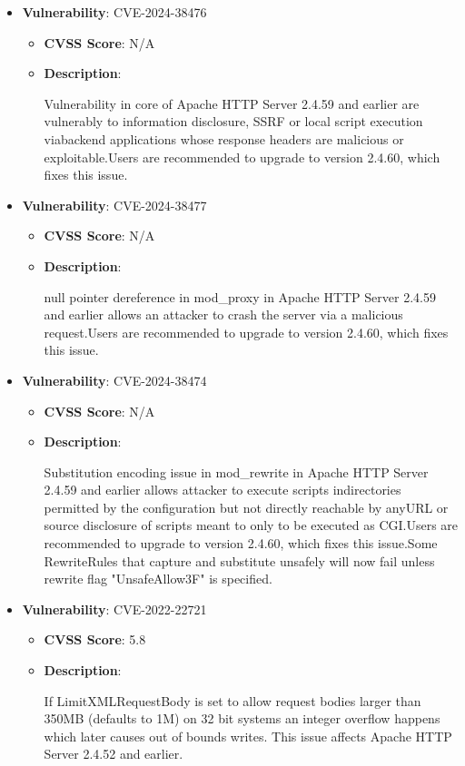 \documentclass{article}
\begin{document}
\begin{itemize}
        \item \textbf{Vulnerability}: CVE-2024-38476
        \begin{itemize}
            \item \textbf{CVSS Score}:  N/A 
            \item \textbf{Description}:
            \parbox[t]{0.9\linewidth}{
                \ttfamily Vulnerability in core of Apache HTTP Server 2.4.59 and earlier are vulnerably to information disclosure, SSRF or local script execution viabackend applications whose response headers are malicious or exploitable.Users are recommended to upgrade to version 2.4.60, which fixes this issue.
            }
        \end{itemize}
    
        \item \textbf{Vulnerability}: CVE-2024-38477
        \begin{itemize}
            \item \textbf{CVSS Score}:  N/A 
            \item \textbf{Description}:
            \parbox[t]{0.9\linewidth}{
                \ttfamily null pointer dereference in mod\_proxy in Apache HTTP Server 2.4.59 and earlier allows an attacker to crash the server via a malicious request.Users are recommended to upgrade to version 2.4.60, which fixes this issue.
            }
        \end{itemize}
    
        \item \textbf{Vulnerability}: CVE-2024-38474
        \begin{itemize}
            \item \textbf{CVSS Score}:  N/A 
            \item \textbf{Description}:
            \parbox[t]{0.9\linewidth}{
                \ttfamily Substitution encoding issue in mod\_rewrite in Apache HTTP Server 2.4.59 and earlier allows attacker to execute scripts indirectories permitted by the configuration but not directly reachable by anyURL or source disclosure of scripts meant to only to be executed as CGI.Users are recommended to upgrade to version 2.4.60, which fixes this issue.Some RewriteRules that capture and substitute unsafely will now fail unless rewrite flag "UnsafeAllow3F" is specified.
            }
        \end{itemize}
    
        \item \textbf{Vulnerability}: CVE-2022-22721
        \begin{itemize}
            \item \textbf{CVSS Score}:  5.8 
            \item \textbf{Description}:
            \parbox[t]{0.9\linewidth}{
                \ttfamily If LimitXMLRequestBody is set to allow request bodies larger than 350MB (defaults to 1M) on 32 bit systems an integer overflow happens which later causes out of bounds writes. This issue affects Apache HTTP Server 2.4.52 and earlier.
            }
        \end{itemize}
    

\end{itemize}
\end{document}
